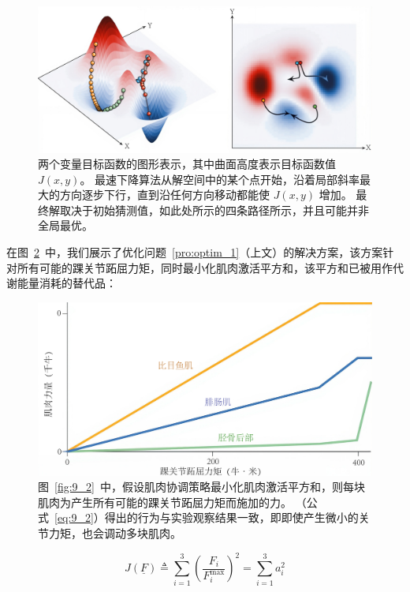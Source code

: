 \begin{figure}[!htb]
	\centering
	\includegraphics[width=1.0\linewidth]{chap9/9_4}
	\caption{两个变量目标函数的图形表示，其中曲面高度表示目标函数值 $J(x,y)$。
		最速下降算法从解空间中的某个点开始，沿着局部斜率最大的方向逐步下行，直到沿任何方向移动都能使 $J(x,y)$ 增加。
		最终解取决于初始猜测值，如此处所示的四条路径所示，并且可能并非全局最优。 \label{fig:9_4}}
\end{figure}


在图~\ref{fig:9_5}~中，我们展示了优化问题~\ref{pro:optim_1}（上文）的解决方案，该方案针对所有可能的踝关节跖屈力矩，同时最小化肌肉激活平方和，该平方和已被用作代谢能量消耗的替代品：


\begin{figure}[!htb]
	\centering
	\includegraphics[width=1.0\linewidth]{chap9/9_5}
	\caption{图~\ref{fig:9_2}~中，假设肌肉协调策略最小化肌肉激活平方和，则每块肌肉为产生所有可能的踝关节跖屈力矩而施加的力。
		（公式~\ref{eq:9_2}）得出的行为与实验观察结果一致，即即使产生微小的关节力矩，也会调动多块肌肉。 \label{fig:9_5}}
\end{figure}

\begin{equation}
	J ( \underline{F} ) 
		\triangleq 
		\sum_{i=1}^{3}
			( \frac{F_i}{F_i^\text{max}} )^2
		= 
		\sum_{i=1}^{3} a_i^2
	\label{eq:9_2}
\end{equation}


